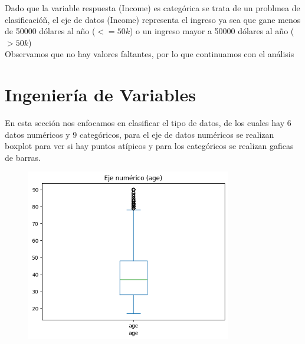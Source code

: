 \documentclass{article}
\begin{document}
	Dado que la variable respuesta (Income) es categórica se trata de un problmea de clasificacióñ, el eje de datos (Income) representa el ingreso ya sea que gane menos de 50000 dólares al año ($<=50k$) o un ingreso mayor a 50000 dólares al año ($>50k$)\\
	
	Observamos que no hay valores faltantes, por lo que continuamos con el análisis
	
	\section{Ingeniería de Variables}
	
	En esta sección nos enfocamos en clasificar el tipo de datos, de los cuales hay 6 datos numéricos y 9 categóricos, para el eje de datos numéricos se realizan boxplot para ver si hay puntos atípicos y para los categóricos se realizan gaficas de barras.
	
	
	\begin{figure}[H]
		\centering
		\includegraphics[width=0.8\textwidth]{age.png}  
	\end{figure}
	
\end{document}
